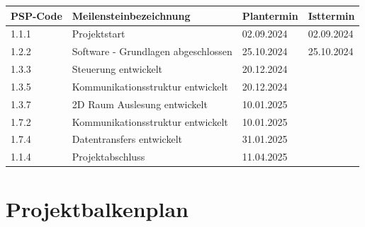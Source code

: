 \begin{longtable}[c]{|p{3cm}|p{6cm}|p{3cm}|l|}
\hline
\textbf{PSP-Code} & \textbf{Meilensteinbezeichnung} & \textbf{Plantermin} & \textbf{Isttermin} \\
\hline
1.1.1 & Projektstart & 02.09.2024 & 02.09.2024 \\
\hline
1.2.2 & Software - Grundlagen abgeschlossen & 25.10.2024 & 25.10.2024 \\
\hline
1.3.3 & Steuerung entwickelt & 20.12.2024 & \\
\hline
1.3.5 & Kommunikationsstruktur entwickelt & 20.12.2024 & \\
\hline
1.3.7 & 2D Raum Auslesung entwickelt & 10.01.2025 & \\
\hline
1.7.2 & Kommunikationsstruktur entwickelt & 10.01.2025 & \\
\hline
1.7.4 & Datentransfers entwickelt & 31.01.2025 & \\
\hline
1.1.4 & Projektabschluss & 11.04.2025 & \\
\hline
\end{longtable}

\newpage

\section{Projektbalkenplan}

